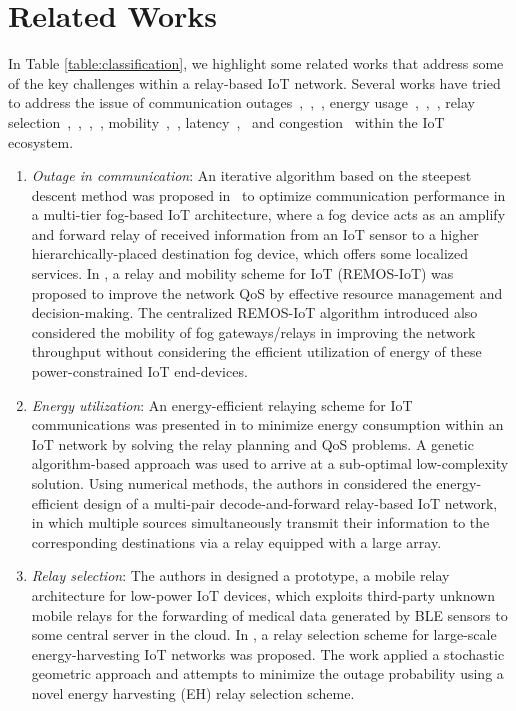 \documentclass[journal]{IEEEtran}
\begin{document}
\section{Related Works}
In Table \ref{table:classification}, we highlight some related works that address some of the key challenges within a relay-based IoT network.
Several works have tried to address the issue of communication outages~\cite{OmoniwaRelay2018},~\cite{Simiscuka2018},~\cite{Kawabata2017}, energy usage~\cite{Alsharoa2018},~\cite{Lv2018},~\cite{Behdad2018}, relay selection~\cite{OmoniwaRelay2018},~\cite{Simiscuka2018},~\cite{Manzoor2018},~\cite{Kawabata2017}, mobility~\cite{OmoniwaRelay2018},~\cite{Manzoor2018}, latency~\cite{Simiscuka2018},~\cite{Behdad2018} and congestion~\cite{Behdad2018} within the IoT ecosystem.
\begin{enumerate}[label=\alph*)]
  \item \emph{Outage in communication}: An iterative algorithm based on the steepest descent method was proposed in~\cite{OmoniwaRelay2018} to optimize communication performance in a multi-tier fog-based IoT architecture, where a fog device acts as an amplify and forward relay of received information from an IoT sensor to a higher hierarchically-placed destination fog device, which offers some localized services. In \cite{Simiscuka2018}, a relay and mobility scheme for IoT (REMOS-IoT) was proposed to improve the network QoS by effective resource management and decision-making. The centralized REMOS-IoT algorithm introduced also considered the mobility of fog gateways/relays in improving the network throughput without considering the efficient utilization of energy of these power-constrained IoT end-devices.
  \item \emph{Energy utilization}: An energy-efficient relaying scheme for IoT communications was presented in \cite{Alsharoa2018} to minimize energy consumption within an IoT network by solving the relay planning and QoS problems. A genetic algorithm-based approach was used to arrive at a sub-optimal low-complexity solution. Using numerical methods, the authors in \cite{Lv2018} considered the energy-efficient design of a multi-pair decode-and-forward relay-based IoT network, in which multiple sources simultaneously transmit their information to the corresponding destinations via a relay equipped with a large array.
  \item \emph{Relay selection}: The authors in \cite{Manzoor2018} designed a prototype, a mobile relay architecture for low-power IoT devices, which exploits third-party unknown mobile relays for the forwarding of medical data generated by BLE sensors to some central server in the cloud. In \cite{Kawabata2017}, a relay selection scheme for large-scale energy-harvesting IoT networks was proposed. The work applied a stochastic geometric approach and attempts to minimize the outage probability using a novel energy harvesting (EH) relay selection scheme.
\end{enumerate}
\end{document}
